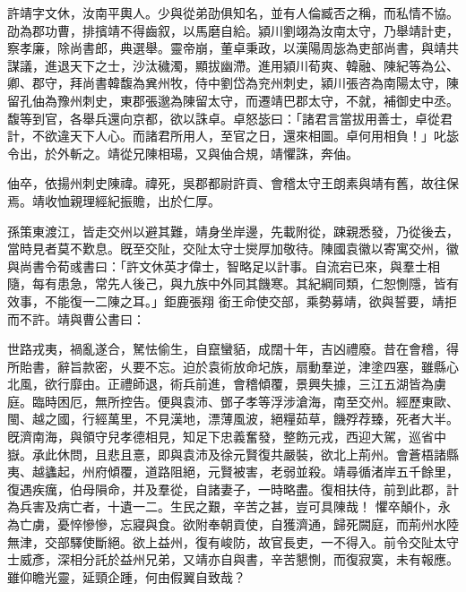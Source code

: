 \begin{pinyinscope}
 
 
 許靖字文休，汝南平輿人。少與從弟劭俱知名，並有人倫臧否之稱，而私情不協。劭為郡功曹，排擯靖不得齒叙，以馬磨自給。潁川劉翊為汝南太守，乃舉靖計吏，察孝廉，除尚書郎，典選舉。靈帝崩，董卓秉政，以漢陽周毖為吏部尚書，與靖共謀議，進退天下之士，沙汰穢濁，顯拔幽滯。進用潁川荀爽、韓融、陳紀等為公、卿、郡守，拜尚書韓馥為兾州牧，侍中劉岱為兖州刺史，潁川張咨為南陽太守，陳留孔伷為豫州刺史，東郡張邈為陳留太守，而遷靖巴郡太守，不就，補御史中丞。馥等到官，各舉兵還向京都，欲以誅卓。卓怒毖曰：「諸君言當拔用善士，卓從君計，不欲違天下人心。而諸君所用人，至官之日，還來相圖。卓何用相負！」叱毖令出，於外斬之。靖從兄陳相瑒，又與伷合規，靖懼誅，奔伷。
 
 
 伷卒，依揚州刺史陳禕。禕死，吳郡都尉許貢、會稽太守王朗素與靖有舊，故往保焉。靖收恤親理經紀振贍，出於仁厚。
 
 
孫策東渡江，皆走交州以避其難，靖身坐岸邊，先載附從，踈親悉發，乃從後去，當時見者莫不歎息。旣至交阯，交阯太守士爕厚加敬待。陳國袁徽以寄寓交州，徽與尚書令荀彧書曰：「許文休英才偉士，智略足以計事。自流宕已來，與羣士相隨，每有患急，常先人後己，與九族中外同其饑寒。其紀綱同類，仁恕惻隱，皆有效事，不能復一二陳之耳。」鉅鹿張翔
 銜王命使交部，乘勢募靖，欲與誓要，靖拒而不許。靖與曹公書曰：
 
 
世路戎夷，禍亂遂合，駑怯偷生，自竄蠻貊，成闊十年，吉凶禮廢。昔在會稽，得所貽書，辭旨款密，乆要不忘。迫於袁術放命圮族，扇動羣逆，津塗四塞，雖縣心北風，欲行靡由。正禮師退，術兵前進，會稽傾覆，景興失據，三江五湖皆為虜庭。臨時困厄，無所控告。便與袁沛、鄧子孝等浮涉滄海，南至交州。經歷東歐、閩、越之國，行經萬里，不見漢地，漂薄風波，絕糧茹草，饑殍荐臻，死者大半。旣濟南海，與領守兒孝德相見，知足下忠義奮發，整飭元戎，西迎大駕，巡省中嶽。承此休問，且悲且憙，即與袁沛及徐元賢復共嚴裝，欲北上荊州。會蒼梧諸縣夷、越蠭起，州府傾覆，道路阻絕，元賢被害，老弱並殺。靖尋循渚岸五千餘里，復遇疾癘，伯母隕命，并及羣從，自諸妻子，一時略盡。復相扶侍，前到此郡，計為兵害及病亡者，十遺一二。生民之艱，辛苦之甚，豈可具陳哉！
 懼卒顛仆，永為亡虜，憂悴慘慘，忘寢與食。欲附奉朝貢使，自獲濟通，歸死闕庭，而荊州水陸無津，交部驛使斷絕。欲上益州，復有峻防，故官長吏，一不得入。前令交阯太守士威彥，深相分託於益州兄弟，又靖亦自與書，辛苦懇惻，而復寂寞，未有報應。雖仰瞻光靈，延頸企踵，何由假翼自致哉？
 

\end{pinyinscope}
